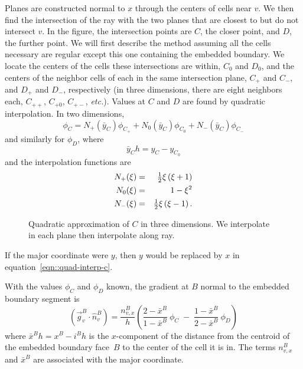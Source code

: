 Planes are constructed normal to $x$ through the centers of cells
near $v$.  We then find the
intersection of the ray with the two planes that are closest to but do
not intersect $v$.  In the figure, the intersection points are $C$,
the closer point, and $D$, the further point.
We will first describe the method assuming all the cells necessary are
regular except this one containing the embedded boundary.
We locate the centers of the cells these intersections are
within, $C_0$ and $D_0$, and the centers of the neighbor cells of each
in the same intersection plane, $C_+$ and $C_-$, and $D_+$ and $D_-$,
respectively (in three dimensions, there are eight neighbors each,
$C_{++}$, $C_{+0}$, $C_{+-}$, {\em etc.}).
Values at $C$ and $D$ are
found by quadratic interpolation.  In two dimensions,
\begin{equation}
\phi_C = N_+(\bar{y}_C) \phi_{C_+} + 
         N_0(\bar{y}_C) \phi_{C_0} + 
         N_-(\bar{y}_C) \phi_{C_-} 
\label{eqn::quad-interp-c}
\end{equation}
and similarly for $\phi_D$, where
\begin{equation}
\bar{y}_C h = y_C - y_{C_0} 
\label{eqn::ybar}
\end{equation}
and the interpolation functions are
\begin{eqnarray}
N_+(\xi) &=& \mbox{$\frac{1}{2}$} \xi \left( \xi + 1 \right) \nonumber \\
N_0(\xi) &=& 1 - \xi^2 \\
N_-(\xi) &=& \mbox{$\frac{1}{2}$} \xi \left( \xi - 1 \right) \nonumber .
\end{eqnarray}
\begin{figure}
\epsfxsize=3.0in
\hspace{1.0in} 
\caption{Quadratic approximation of $C$ in three dimensions.   We
  interpolate in each plane then interpolate along ray.}
\label{fig::ebdirbc3D}
\end{figure}
If the major coordinate were $y$, then $y$ would be replaced by $x$
in equation~\ref{eqn::quad-interp-c}.

With the values $\phi_C$ and $\phi_D$ known, the gradient at $B$ normal
to the embedded boundary segment is
\begin{equation}
\left( \vec{g}^B_v \!\cdot\! \widehat{n}^B_v \right) = 
\frac{n^B_{v,x}}{h}
\left( 
\frac{2-\bar{x}^B}{1-\bar{x}^B}~\phi_C 
\;-\;
\frac{1-\bar{x}^B}{2-\bar{x}^B}~\phi_D 
\right)
\end{equation}
where $\bar{x}^B h = x^B - i^Bh$ is the $x$-component of the distance from
the centroid of the embedded boundary face~$B$ to the center of the cell
it is in.  The terms $n^B_{v,x}$ and $\bar{x}^B$ are associated with the
major coordinate.

